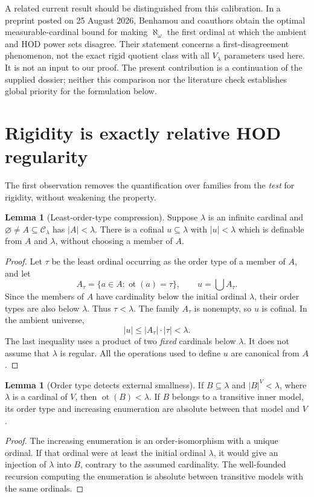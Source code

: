 \documentclass[11pt,letterpaper]{article}
\theoremstyle{definition}
\newtheorem{lemma}[definition]{Lemma}
\numberwithin{equation}{section}
\newcommand{\ot}{\operatorname{ot}}
\newcommand{\Clam}{\mathcal C_\lambda}
\begin{document}
A related current result should be distinguished from this calibration.
In a preprint posted on 25 August 2026, Benhamou and coauthors
\cite{BCGHP} obtain the optimal measurable-cardinal bound for making
$\aleph_\omega$ the first ordinal at which the ambient and HOD power sets
disagree. Their statement concerns a first-disagreement phenomenon, not
the exact rigid quotient class with all $V_\lambda$ parameters used here.
It is not an input to our proof. The present contribution is a continuation
of the supplied dossier; neither this comparison nor the literature check
establishes global priority for the formulation below.

\section{Rigidity is exactly relative HOD regularity}\label{sec:regular}

The first observation removes the quantification over families from the
\emph{test} for rigidity, without weakening the property.

\begin{lemma}[Least-order-type compression]\label{lem:compression}
Suppose $\lambda$ is an infinite cardinal and
$\varnothing\ne A\subseteq\Clam$ has $|A|<\lambda$.
There is a cofinal $u\subseteq\lambda$ with $|u|<\lambda$ which is definable
from $A$ and $\lambda$, without choosing a member of $A$.
\end{lemma}
\begin{proof}
Let $\tau$ be the least ordinal occurring as the order type of a member of $A$,
and let
\[
 A_\tau=\{a\in A:\ot(a)=\tau\},\qquad u=\bigcup A_\tau.
\]
Since the members of $A$ have cardinality below the initial ordinal $\lambda$,
their order types are also below $\lambda$. Thus $\tau<\lambda$.
The family $A_\tau$ is nonempty, so $u$ is cofinal. In the ambient universe,
\[
 |u|\le |A_\tau|\cdot|\tau|<\lambda.
\]
The last inequality uses a product of two \emph{fixed} cardinals below
$\lambda$. It does not assume that $\lambda$ is regular. All the operations
used to define $u$ are canonical from $A$.
\end{proof}

\begin{lemma}[Order type detects external smallness]\label{lem:otp}
If $B\subseteq\lambda$ and $|B|^V<\lambda$, where $\lambda$ is a cardinal
of $V$, then $\ot(B)<\lambda$. If $B$ belongs to a transitive inner model,
its order type and increasing enumeration are absolute between that model and $V$.
\end{lemma}
\begin{proof}
The increasing enumeration is an order-isomorphism with a unique ordinal.
If that ordinal were at least the initial ordinal $\lambda$, it would give
an injection of $\lambda$ into $B$, contrary to the assumed cardinality.
The well-founded recursion computing the enumeration is absolute between
transitive models with the same ordinals.
\end{proof}
\end{document}
